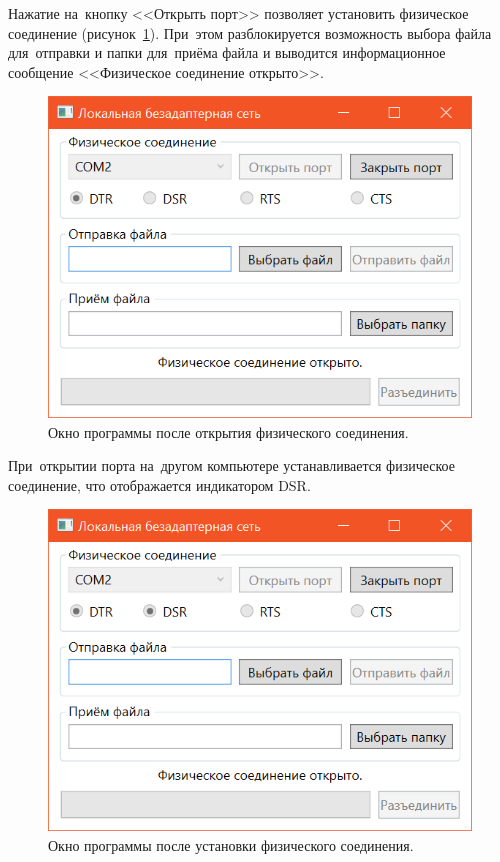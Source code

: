 \documentclass[a4paper,12pt]{article}
\begin{document}
Нажатие на~кнопку <<Открыть порт>> позволяет установить физическое соединение (рисунок~\ref{open}). При~этом разблокируется возможность выбора файла для~отправки и папки для~приёма файла и выводится информационное сообщение <<Физическое соединение открыто>>.
\begin{figure}
\centering
\includegraphics{open.png}
\caption{Окно программы после открытия физического соединения.}\label{open}
\end{figure}
При~открытии порта на~другом компьютере устанавливается физическое соединение, что отображается индикатором DSR.
\begin{figure}
\centering
\includegraphics{dsr.png}
\caption{Окно программы после установки физического соединения.}\label{dsr}
\end{figure}
\end{document}
